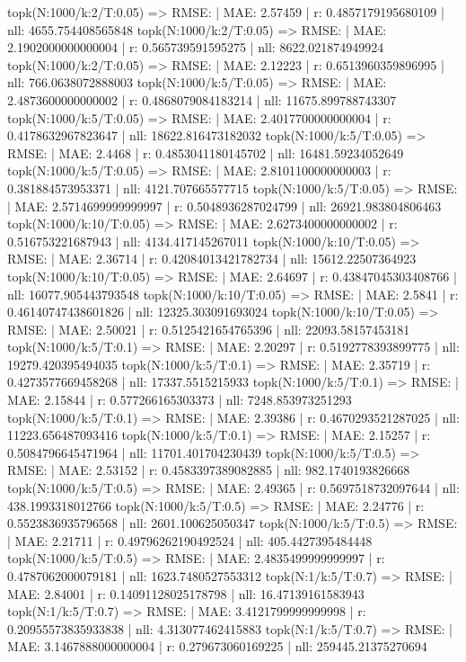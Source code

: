 topk(N:1000/k:2/T:0.05) => RMSE: | MAE: 2.57459 | r: 0.4857179195680109 | nll: 4655.754408565848
topk(N:1000/k:2/T:0.05) => RMSE: | MAE: 2.1902000000000004 | r: 0.565739591595275 | nll: 8622.021874949924
topk(N:1000/k:2/T:0.05) => RMSE: | MAE: 2.12223 | r: 0.6513960359896995 | nll: 766.0638072888003
topk(N:1000/k:5/T:0.05) => RMSE: | MAE: 2.4873600000000002 | r: 0.4868079084183214 | nll: 11675.899788743307
topk(N:1000/k:5/T:0.05) => RMSE: | MAE: 2.4017700000000004 | r: 0.4178632967823647 | nll: 18622.816473182032
topk(N:1000/k:5/T:0.05) => RMSE: | MAE: 2.4468 | r: 0.4853041180145702 | nll: 16481.59234052649
topk(N:1000/k:5/T:0.05) => RMSE: | MAE: 2.8101100000000003 | r: 0.381884573953371 | nll: 4121.707665577715
topk(N:1000/k:5/T:0.05) => RMSE: | MAE: 2.5714699999999997 | r: 0.5048936287024799 | nll: 26921.983804806463
topk(N:1000/k:10/T:0.05) => RMSE: | MAE: 2.6273400000000002 | r: 0.516753221687943 | nll: 4134.417145267011
topk(N:1000/k:10/T:0.05) => RMSE: | MAE: 2.36714 | r: 0.42084013421782734 | nll: 15612.22507364923
topk(N:1000/k:10/T:0.05) => RMSE: | MAE: 2.64697 | r: 0.43847045303408766 | nll: 16077.905443793548
topk(N:1000/k:10/T:0.05) => RMSE: | MAE: 2.5841 | r: 0.46140747438601826 | nll: 12325.303091693024
topk(N:1000/k:10/T:0.05) => RMSE: | MAE: 2.50021 | r: 0.5125421654765396 | nll: 22093.58157453181
topk(N:1000/k:5/T:0.1) => RMSE: | MAE: 2.20297 | r: 0.5192778393899775 | nll: 19279.420395494035
topk(N:1000/k:5/T:0.1) => RMSE: | MAE: 2.35719 | r: 0.4273577669458268 | nll: 17337.5515215933
topk(N:1000/k:5/T:0.1) => RMSE: | MAE: 2.15844 | r: 0.577266165303373 | nll: 7248.853973251293
topk(N:1000/k:5/T:0.1) => RMSE: | MAE: 2.39386 | r: 0.4670293521287025 | nll: 11223.656487093416
topk(N:1000/k:5/T:0.1) => RMSE: | MAE: 2.15257 | r: 0.5084796645471964 | nll: 11701.401704230439
topk(N:1000/k:5/T:0.5) => RMSE: | MAE: 2.53152 | r: 0.4583397389082885 | nll: 982.1740193826668
topk(N:1000/k:5/T:0.5) => RMSE: | MAE: 2.49365 | r: 0.5697518732097644 | nll: 438.1993318012766
topk(N:1000/k:5/T:0.5) => RMSE: | MAE: 2.24776 | r: 0.5523836935796568 | nll: 2601.100625050347
topk(N:1000/k:5/T:0.5) => RMSE: | MAE: 2.21711 | r: 0.49796262190492524 | nll: 405.4427395484448
topk(N:1000/k:5/T:0.5) => RMSE: | MAE: 2.4835499999999997 | r: 0.4787062000079181 | nll: 1623.7480527553312
topk(N:1/k:5/T:0.7) => RMSE: | MAE: 2.84001 | r: 0.14091128025178798 | nll: 16.47139161583943
topk(N:1/k:5/T:0.7) => RMSE: | MAE: 3.4121799999999998 | r: 0.20955573835933838 | nll: 4.313077462415883
topk(N:1/k:5/T:0.7) => RMSE: | MAE: 3.1467888000000004 | r: 0.279673060169225 | nll: 259445.21375270694
